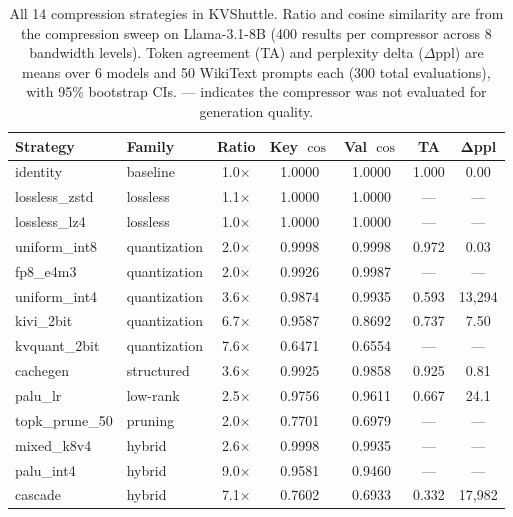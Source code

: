 \documentclass{article}
\begin{document}
\begin{table}[t]
\centering
\caption{All 14 compression strategies in KVShuttle. Ratio and cosine similarity are from the compression sweep on Llama-3.1-8B (400 results per compressor across 8 bandwidth levels). Token agreement (TA) and perplexity delta ($\Delta$ppl) are means over 6 models and 50 WikiText prompts each (300 total evaluations), with 95\% bootstrap CIs. --- indicates the compressor was not evaluated for generation quality.}
\label{tab:full_compressors}
\small
\begin{tabular}{llccccc}
\toprule
\textbf{Strategy} & \textbf{Family} & \textbf{Ratio} & \textbf{Key $\cos$} & \textbf{Val $\cos$} & \textbf{TA} & $\boldsymbol{\Delta}$\textbf{ppl} \\
\midrule
identity & baseline & 1.0$\times$ & 1.0000 & 1.0000 & 1.000 & 0.00 \\
\midrule
lossless\_zstd & lossless & 1.1$\times$ & 1.0000 & 1.0000 & --- & --- \\
lossless\_lz4 & lossless & 1.0$\times$ & 1.0000 & 1.0000 & --- & --- \\
\midrule
uniform\_int8 & quantization & 2.0$\times$ & 0.9998 & 0.9998 & 0.972 & 0.03 \\
fp8\_e4m3 & quantization & 2.0$\times$ & 0.9926 & 0.9987 & --- & --- \\
uniform\_int4 & quantization & 3.6$\times$ & 0.9874 & 0.9935 & 0.593 & 13{,}294 \\
kivi\_2bit & quantization & 6.7$\times$ & 0.9587 & 0.8692 & 0.737 & 7.50 \\
kvquant\_2bit & quantization & 7.6$\times$ & 0.6471 & 0.6554 & --- & --- \\
\midrule
cachegen & structured & 3.6$\times$ & 0.9925 & 0.9858 & 0.925 & 0.81 \\
\midrule
palu\_lr & low-rank & 2.5$\times$ & 0.9756 & 0.9611 & 0.667 & 24.1 \\
\midrule
topk\_prune\_50 & pruning & 2.0$\times$ & 0.7701 & 0.6979 & --- & --- \\
\midrule
mixed\_k8v4 & hybrid & 2.6$\times$ & 0.9998 & 0.9935 & --- & --- \\
palu\_int4 & hybrid & 9.0$\times$ & 0.9581 & 0.9460 & --- & --- \\
cascade & hybrid & 7.1$\times$ & 0.7602 & 0.6933 & 0.332 & 17{,}982 \\
\bottomrule
\end{tabular}
\end{table}
\end{document}
